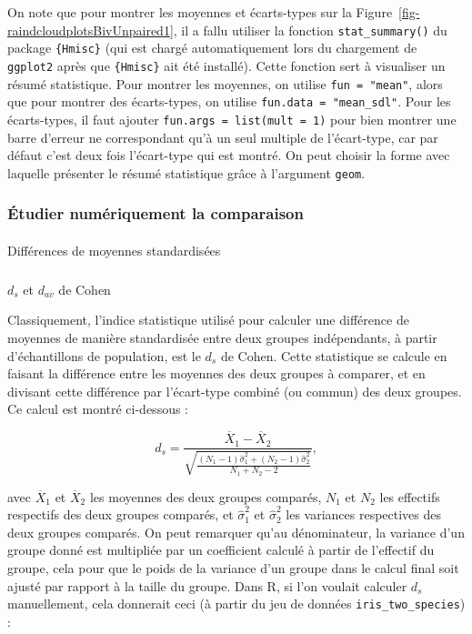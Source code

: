 \documentclass[
  letterpaper,
]{book}
\makeatletter
\let\oldparagraph\paragraph
\renewcommand{\paragraph}{
    \@ifstar
      \xxxParagraphStar
      \xxxParagraphNoStar
  }
\newcommand{\xxxParagraphStar}[1]{\oldparagraph*{#1}\mbox{}}
\newcommand{\xxxParagraphNoStar}[1]{\oldparagraph{#1}\mbox{}}
\let\oldsubparagraph\subparagraph
\renewcommand{\subparagraph}{
    \@ifstar
      \xxxSubParagraphStar
      \xxxSubParagraphNoStar
  }
\newcommand{\xxxSubParagraphStar}[1]{\oldsubparagraph*{#1}\mbox{}}
\newcommand{\xxxSubParagraphNoStar}[1]{\oldsubparagraph{#1}\mbox{}}
\makeatother
\begin{document}
On note que pour montrer les moyennes et écarts-types sur la
Figure~\ref{fig-raindcloudplotsBivUnpaired1}, il a fallu utiliser la
fonction \texttt{stat\_summary()} du package \texttt{\{Hmisc\}} (qui est
chargé automatiquement lors du chargement de \texttt{ggplot2} après que
\texttt{\{Hmisc\}} ait été installé). Cette fonction sert à visualiser
un résumé statistique. Pour montrer les moyennes, on utilise
\texttt{fun\ =\ "mean"}, alors que pour montrer des écarts-types, on
utilise \texttt{fun.data\ =\ "mean\_sdl"}. Pour les écarts-types, il
faut ajouter \texttt{fun.args\ =\ list(mult\ =\ 1)} pour bien montrer
une barre d'erreur ne correspondant qu'à un seul multiple de
l'écart-type, car par défaut c'est deux fois l'écart-type qui est
montré. On peut choisir la forme avec laquelle présenter le résumé
statistique grâce à l'argument \texttt{geom}.

\subsubsection{Étudier numériquement la
comparaison}\label{uxe9tudier-numuxe9riquement-la-comparaison}

\paragraph{Différences de moyennes
standardisées}\label{diffuxe9rences-de-moyennes-standardisuxe9es-1}

\subparagraph{\texorpdfstring{\(d_{s}\) et \(d_{av}\) de
Cohen}{d\_\{s\} et d\_\{av\} de Cohen}}\label{d_s-et-d_av-de-cohen}

Classiquement, l'indice statistique utilisé pour calculer une différence
de moyennes de manière standardisée entre deux groupes indépendants, à
partir d'échantillons de population, est le \(d_{s}\) de Cohen. Cette
statistique se calcule en faisant la différence entre les moyennes des
deux groupes à comparer, et en divisant cette différence par
l'écart-type combiné (ou commun) des deux groupes. Ce calcul est montré
ci-dessous :

\[d_{s} = \frac{\overline{X}_{1} - \overline{X}_{2}} {\sqrt{\frac{(N_{1} - 1) \hat{\sigma}_{1}^2 + (N_{2} - 1) \hat{\sigma}_{2}^2} {N_{1} + N_{2} - 2}}},\]

avec \(\overline{X}_{1}\) et \(\overline{X}_{2}\) les moyennes des deux
groupes comparés, \(N_{1}\) et \(N_{2 }\) les effectifs respectifs des
deux groupes comparés, et \(\hat{\sigma}_{1}^2\) et
\(\hat{\sigma}_{2}^2\) les variances respectives des deux groupes
comparés. On peut remarquer qu'au dénominateur, la variance d'un groupe
donné est multipliée par un coefficient calculé à partir de l'effectif
du groupe, cela pour que le poids de la variance d'un groupe dans le
calcul final soit ajusté par rapport à la taille du groupe. Dans R, si
l'on voulait calculer \(d_s\) manuellement, cela donnerait ceci (à
partir du jeu de données \texttt{iris\_two\_species}) :
\end{document}
